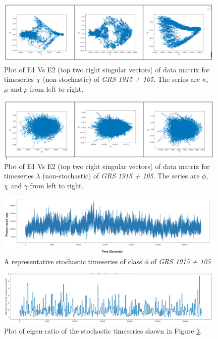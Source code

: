 \documentclass[10pt,conference]{IEEEtran}
\begin{document}
\begin{figure}[ht]
  \centering
  \includegraphics[width=\linewidth]{svd_non_stochastic.png}
  \caption{Plot of E1 Vs E2 (top two right singular vectors) of data matrix for  timeseries $\chi$ (non-stochastic) of \textit{GRS 1915 + 105}. The series are $\kappa$, $\mu$ and $\rho$ from left to right.}
  \label{svd_e1e2_nonstochastic}
\end{figure}

\begin{figure}[ht]
  \centering
  \includegraphics[width=\linewidth]{svd_stochastic.png}
  \caption{Plot of E1 Vs E2 (top two right singular vectors) of data matrix for  timeseries $\lambda$ (non-stochastic) of \textit{GRS 1915 + 105}. The series are $\phi$, $\chi$ and $\gamma$ from left to right.}
  \label{svd_e1e2_stochastic}
\end{figure}

\begin{figure}[ht]
  \centering
  \includegraphics[width=0.9\linewidth]{phi_ts_edited.drawio.png}
  \caption{A representative stochastic timeseries of class $\phi$ of \textit{GRS 1915 + 105} }
  \label{phi_ts}
  \end{figure}

\begin{figure}[ht]
  \centering
  \includegraphics[width=0.9\linewidth]{phi_ts_eig.png}
  \caption{Plot of eigen-ratio of the stochastic timeseries shown in Figure \ref{phi_ts}.}
  \label{phi_eig}
\end{figure}
\end{document}
